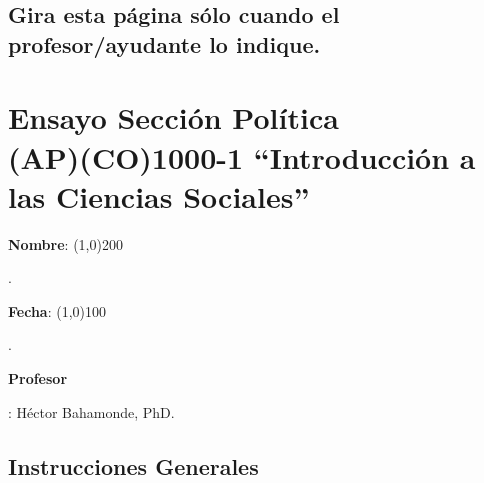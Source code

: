 \documentclass{article}
\begin{document}
\subsection*{Gira esta p\'agina s\'olo cuando el profesor/ayudante lo indique.}

\clearpage
\newpage

{\centering\section*{Ensayo Secci\'on Pol\'itica\\(AP)(CO)1000-1 ``Introducci\'on a las Ciencias Sociales''}}

{\vspace{.5cm}\raggedright{\bf Nombre}: \line(1,0){200}}. %
{\vspace{.5cm}\hspace{4.5cm}\raggedright{\bf Fecha}: \line(1,0){100}}. %


{\vspace{.5cm}\raggedright \bf Profesor}: H\'ector Bahamonde, PhD.\\


\vspace{0.5cm}\subsection*{Instrucciones Generales}
\end{document}
